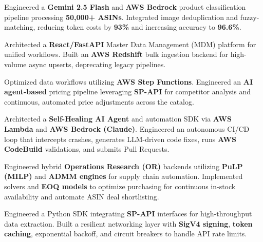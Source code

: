 \documentclass[letterpaper,10pt]{article}
\begin{document}
\begin{resume_list}
    \item{Engineered a \textbf{Gemini 2.5 Flash} and \textbf{AWS Bedrock} product classification pipeline processing \textbf{50,000+ ASINs}. Integrated image deduplication and fuzzy-matching, reducing token costs by \textbf{93\%} and increasing accuracy to \textbf{96.6\%}.}
    \item{Architected a \textbf{React/FastAPI} Master Data Management (MDM) platform for unified workflows. Built an \textbf{AWS Redshift} bulk ingestion backend for high-volume async upserts, deprecating legacy pipelines.}
    \item{Optimized data workflows utilizing \textbf{AWS Step Functions}. Engineered an \textbf{AI agent-based} pricing pipeline leveraging \textbf{SP-API} for competitor analysis and continuous, automated price adjustments across the catalog.}
    \item{Architected a \textbf{Self-Healing AI Agent} and automation SDK via \textbf{AWS Lambda} and \textbf{AWS Bedrock (Claude)}. Engineered an autonomous CI/CD loop that intercepts crashes, generates LLM-driven code fixes, runs \textbf{AWS CodeBuild} validations, and submits Pull Requests.}
    \item{Engineered hybrid \textbf{Operations Research (OR)} backends utilizing \textbf{PuLP (MILP)} and \textbf{ADMM engines} for supply chain automation. Implemented solvers and \textbf{EOQ models} to optimize purchasing for continuous in-stock availability and automate ASIN deal shortlisting.}
    \item{Engineered a Python SDK integrating \textbf{SP-API} interfaces for high-throughput data extraction. Built a resilient networking layer with \textbf{SigV4 signing}, \textbf{token caching}, exponential backoff, and circuit breakers to handle API rate limits.}
\end{resume_list}
\end{document}
